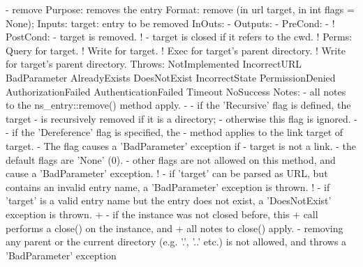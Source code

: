 \begin{myspec}
 
    - remove
      Purpose:  removes the entry
      Format:   remove             (in  url        target,
                                    in  int     flags = None);
      Inputs:   target:             entry to be removed
      InOuts:   -
      Outputs:  -
      PreCond:  -
!     PostCond: - target is removed.
!               - target is closed if it refers to the cwd.
!     Perms:    Query for target.
!               Write for target.
!               Exec  for target's parent directory.
!               Write for target's parent directory.
      Throws:   NotImplemented
                IncorrectURL
                BadParameter
                AlreadyExists
                DoesNotExist
                IncorrectState
                PermissionDenied
                AuthorizationFailed
                AuthenticationFailed
                Timeout
                NoSuccess
      Notes:    - all notes to the ns_entry::remove() method
                  apply.
-               - if the 'Recursive' flag is defined, the target
-                 is recursively removed if it is a directory;
-                 otherwise this flag is ignored.
-               - if the 'Dereference' flag is specified, the
-                 method applies to the link target of target.
-                 The flag causes a 'BadParameter' exception if
-                 target is not a link.
                - the default flags are 'None' (0).
                - other flags are not allowed on this method, 
                  and cause a 'BadParameter' exception.
!               - if 'target' can be parsed as URL, but contains 
                  an invalid entry name, a 'BadParameter'
                  exception is thrown.
!               - if 'target' is a valid entry name but the entry
                  does not exist, a 'DoesNotExist' exception is
                  thrown.
+               - if the instance was not closed before, this
+                 call performs a close() on the instance, and 
+                 all notes to close() apply.
                - removing any parent or the current directory 
                  (e.g.  '.', '..' etc.) is not allowed, and 
                  throws a 'BadParameter' exception
 

\end{myspec}
